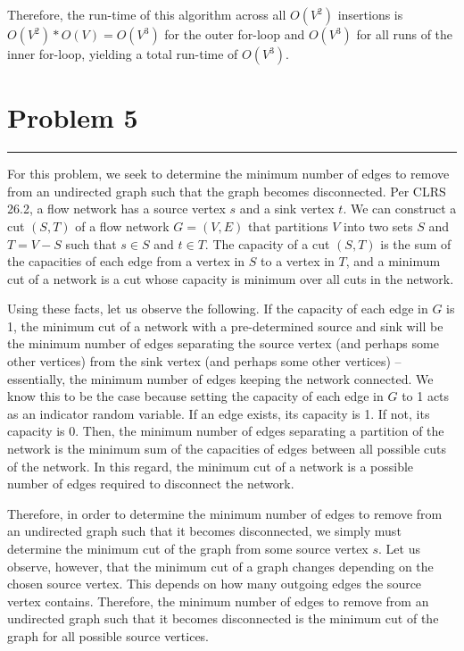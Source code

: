 \documentclass[11pt]{article}
\def\separateline{\medskip\hrule\medskip}
\begin{document}
Therefore, the run-time of this algorithm across all $O(V^2)$ insertions is $O(V^2)*O(V) = O(V^3)$ for the outer for-loop and $O(V^3)$ for all runs of the inner for-loop, yielding a total run-time of $O(V^3)$.

\newpage

\section{Problem 5}
\separateline

For this problem, we seek to determine the minimum number of edges to remove from an undirected graph such that the graph becomes disconnected. Per CLRS 26.2, a flow network has a source vertex $s$ and a sink vertex $t$. We can construct a cut $(S,T)$ of a flow network $G=(V,E)$ that partitions $V$ into two sets $S$ and $T = V - S$ such that $s \in S$ and $t \in T$. The capacity of a cut $(S,T)$ is the sum of the capacities of each edge from a vertex in $S$ to a vertex in $T$, and a minimum cut of a network is a cut whose capacity is minimum over all cuts in the network.

Using these facts, let us observe the following. If the capacity of each edge in $G$ is 1, the minimum cut of a network with a pre-determined source and sink will be the minimum number of edges separating the source vertex (and perhaps some other vertices) from the sink vertex (and perhaps some other vertices) -- essentially, the minimum number of edges keeping the network connected. We know this to be the case because setting the capacity of each edge in $G$ to 1 acts as an indicator random variable. If an edge exists, its capacity is 1. If not, its capacity is 0. Then, the minimum number of edges separating a partition of the network is the minimum sum of the capacities of edges between all possible cuts of the network. In this regard, the minimum cut of a network is a possible number of edges required to disconnect the network.

Therefore, in order to determine the minimum number of edges to remove from an undirected graph such that it becomes disconnected, we simply must determine the minimum cut of the graph from some source vertex $s$. Let us observe, however, that the minimum cut of a graph changes depending on the chosen source vertex. This depends on how many outgoing edges the source vertex contains. Therefore, the minimum number of edges to remove from an undirected graph such that it becomes disconnected is the minimum cut of the graph for all possible source vertices.
\end{document}
